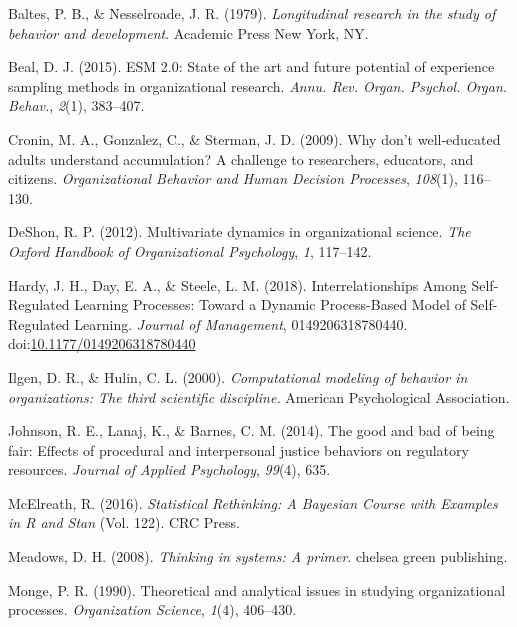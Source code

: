\documentclass[english,,man]{apa6}
\theoremstyle{definition}
\theoremstyle{definition}
\theoremstyle{definition}
\theoremstyle{remark}
\begin{document}
\leavevmode\hypertarget{ref-baltes_longitudinal_1979}{}%
Baltes, P. B., \& Nesselroade, J. R. (1979). \emph{Longitudinal research
in the study of behavior and development}. Academic Press New York, NY.

\leavevmode\hypertarget{ref-beal_esm_2015}{}%
Beal, D. J. (2015). ESM 2.0: State of the art and future potential of
experience sampling methods in organizational research. \emph{Annu. Rev.
Organ. Psychol. Organ. Behav.}, \emph{2}(1), 383--407.

\leavevmode\hypertarget{ref-cronin2009don}{}%
Cronin, M. A., Gonzalez, C., \& Sterman, J. D. (2009). Why don't
well-educated adults understand accumulation? A challenge to
researchers, educators, and citizens. \emph{Organizational Behavior and
Human Decision Processes}, \emph{108}(1), 116--130.

\leavevmode\hypertarget{ref-deshon_multivariate_2012}{}%
DeShon, R. P. (2012). Multivariate dynamics in organizational science.
\emph{The Oxford Handbook of Organizational Psychology}, \emph{1},
117--142.

\leavevmode\hypertarget{ref-hardy_interrelationships_2018}{}%
Hardy, J. H., Day, E. A., \& Steele, L. M. (2018). Interrelationships
Among Self-Regulated Learning Processes: Toward a Dynamic Process-Based
Model of Self-Regulated Learning. \emph{Journal of Management},
0149206318780440.
doi:\href{https://doi.org/10.1177/0149206318780440}{10.1177/0149206318780440}

\leavevmode\hypertarget{ref-ilgen_computational_2000}{}%
Ilgen, D. R., \& Hulin, C. L. (2000). \emph{Computational modeling of
behavior in organizations: The third scientific discipline.} American
Psychological Association.

\leavevmode\hypertarget{ref-johnson_good_2014}{}%
Johnson, R. E., Lanaj, K., \& Barnes, C. M. (2014). The good and bad of
being fair: Effects of procedural and interpersonal justice behaviors on
regulatory resources. \emph{Journal of Applied Psychology},
\emph{99}(4), 635.

\leavevmode\hypertarget{ref-mcelreath_statistical_2016}{}%
McElreath, R. (2016). \emph{Statistical Rethinking: A Bayesian Course
with Examples in R and Stan} (Vol. 122). CRC Press.

\leavevmode\hypertarget{ref-meadows2008thinking}{}%
Meadows, D. H. (2008). \emph{Thinking in systems: A primer}. chelsea
green publishing.

\leavevmode\hypertarget{ref-monge_theoretical_1990}{}%
Monge, P. R. (1990). Theoretical and analytical issues in studying
organizational processes. \emph{Organization Science}, \emph{1}(4),
406--430.
\end{document}
